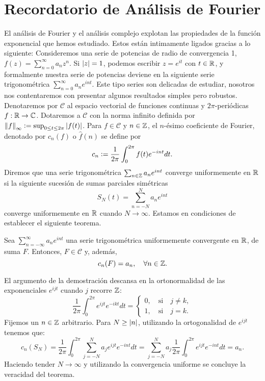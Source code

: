 \section{Recordatorio de Análisis de Fourier}
El análisis de Fourier y el análisis complejo explotan las propiedades de la función 
exponencial que hemos estudiado. Estos están intimamente ligados gracias a lo siguiente:
Consideremos una serie de potencias de radio de convergencia 1, \(f(z) = \sum_{n=0}^{\infty} a_nz^n\).
Si \(\left\lvert z\right\rvert = 1\), podemos escribir \(z = e^{it}\) con \(t\in \mathbb{R}\), y formalmente nuestra serie de 
potencias deviene en la siguiente serie trigonométrica \(\sum_{n=0}^{\infty}a_ne^{int}\). Este tipo 
series son delicadas de estudiar, nosotros nos contentaremos con presentar algunos resultados simples
pero robustos. Denotaremos por \(\mathcal{C}\) al espacio vectorial de funciones continuas y 
\(2\pi\)-periódicas \(f: \mathbb{R} \to \mathbb{C} \). Dotaremos a \(\mathcal{C}\) con la norma infinito definida por
\(\left\lVert f\right\rVert_{\infty} \vcentcolon = \sup_{0\leq t \leq 2\pi} \left\lvert f(t)\right\rvert \). Para \(f \in \mathcal{C}\) y 
\(n\in \mathbb{Z}\), el \(n\)-ésimo coeficiente de Fourier, denotado por \(c_n(f)\) o \(\hat{f}(n)\) se define
por 
\[
c_n \vcentcolon = \frac{1}{2\pi} \int_{0}^{2\pi} f(t) e^{-int} dt.
\]
Diremos que una serie trigonométrica \(\sum_{n\in \mathbb{Z}} a_ne^{int}\) converge uniformemente en \(\mathbb{R}\) si
la siguiente sucesión de sumas parciales simétricas
\[
S_N(t) = \sum_{n=-N}^{N} a_ne^{int}
\]
converge uniformemente en \(\mathbb{R}\) cuando \(N \to \infty\). Estamos en condiciones de establecer el siguiente
teorema.

\begin{theo}
    Sea \(\sum_{n=-\infty}^{\infty}a_ne^{int}\) una serie trigonométrica uniformemente convergente en \(\mathbb{R}\),
    de suma \(F\). Entonces, \(F \in \mathcal{C}\) y, además,
    \[
    c_n(F) = a_n, \quad \forall n\in \mathbb{Z}.
    \]
\end{theo}
\begin{dem}
    El argumento de la demostración descansa en la ortonormalidad de las exponenciales \(e^{ijt}\) cuando 
    \(j\) recorre \(\mathbb{Z}\):
    \[
    \frac{1}{2\pi} \int_{0}^{2\pi} e^{ijt}e^{-ikt} dt = 
        \begin{cases}
        0, \quad \text{si} \quad j\neq k, \\
        1, \quad \text{si} \quad j=k.        
        \end{cases}
    \]
    Fijemos un \(n\in \mathbb{Z}\) arbitrario. Para \(N \geq \left\lvert n\right\rvert\), utilizando la ortogonalidad de \(e^{ijt}\) tenemos que:
    \[
    c_n(S_N) = \frac{1}{2\pi} \int_{0}^{2\pi} \sum_{j=-N}^{N} a_je^{ijt} e^{-int} dt = 
               \sum_{j=-N}^{N} a_j \frac{1}{2\pi} \int_{0}^{2\pi} e^{ijt} e^{-int} dt = a_n.
    \]
    Haciendo tender \(N\to \infty\) y utilizando la convergencia uniforme se concluye la veracidad del teorema.
\end{dem}


